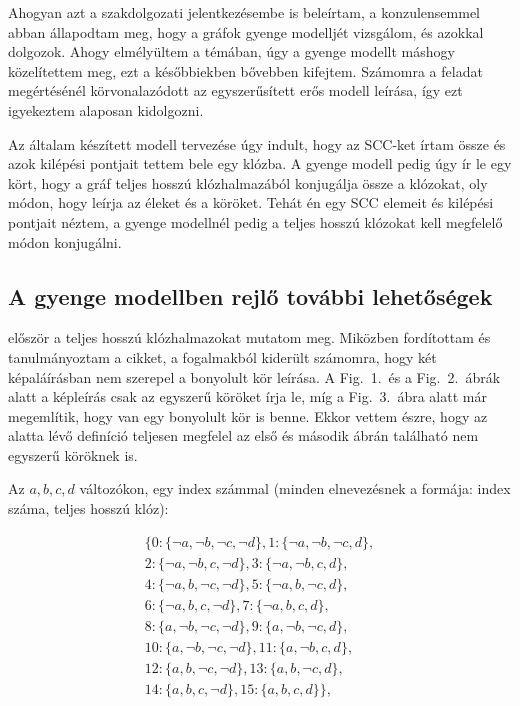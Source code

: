 \documentclass[
]{thesis-ekf}
\theoremstyle{definition}
\theoremstyle{remark}
\begin{document}
	Ahogyan azt a szakdolgozati jelentkezésembe is beleírtam, a konzulensemmel abban állapodtam meg, hogy a gráfok gyenge modelljét vizsgálom, és azokkal dolgozok. Ahogy elmélyültem a témában, úgy a gyenge modellt máshogy közelítettem meg, ezt a későbbiekben bővebben kifejtem. Számomra a feladat megértésénél körvonalazódott az egyszerűsített erős modell leírása, így ezt igyekeztem alaposan kidolgozni.
	
	Az általam készített modell tervezése úgy indult, hogy az \textsc{SCC}-ket írtam össze és azok kilépési pontjait tettem bele egy klózba. A gyenge modell pedig úgy ír le egy kört, hogy a gráf teljes hosszú klózhalmazából konjugálja össze a klózokat, oly módon, hogy leírja az éleket és a köröket. Tehát én egy \textsc{SCC} elemeit és kilépési pontjait néztem, a gyenge modellnél pedig a teljes hosszú klózokat kell megfelelő módon konjugálni.
	
		\subsection{A gyenge modellben rejlő további lehetőségek}
	
	\cite[Kusper Gábor és társai cikkjéből]{am} először a teljes hosszú klózhalmazokat mutatom meg. Miközben fordítottam és tanulmányoztam a cikket, a fogalmakból kiderült számomra, hogy két képaláírásban nem szerepel a bonyolult kör leírása. A Fig.~1.~és a Fig.~2.~ábrák alatt a képleírás csak az egyszerű köröket írja le, míg a Fig.~3.~ábra alatt már megemlítik, hogy van egy bonyolult kör is benne. Ekkor vettem észre, hogy az alatta lévő definíció teljesen megfelel az első és második ábrán található nem egyszerű köröknek is.
	 
	 Az $ {a,b,c,d} $ változókon, egy index számmal (minden elnevezésnek a formája: index száma, teljes hosszú klóz):
	
	\begin{equation}\label{eq-teljes-klozok}
		\begin{split}
			\{0:\{\neg a,\neg b,\neg c,\neg d\},1:\{\neg a,\neg b,\neg c,d\}, \\
			2:\{\neg a,\neg b,c,\neg d\},3:\{\neg a,\neg b,c,d\}, \\
			4:\{\neg a,b,\neg c,\neg d\},5:\{\neg a,b,\neg c,d\}, \\
			6:\{\neg a,b,c,\neg d\},7:\{\neg a,b,c,d\}, \\
			8:\{a,\neg b,\neg c,\neg d\},9:\{a,\neg b,\neg c,d\}, \\
			10:\{a,\neg b,\neg c,\neg d\},11:\{a,\neg b,c,d\}, \\
			12:\{a,b,\neg c,\neg d\},13:\{a,b,\neg c,d\}, \\
			14:\{a,b,c,\neg d\},15:\{a,b,c,d\}\},
		\end{split}
	\end{equation}
				
\end{document}
